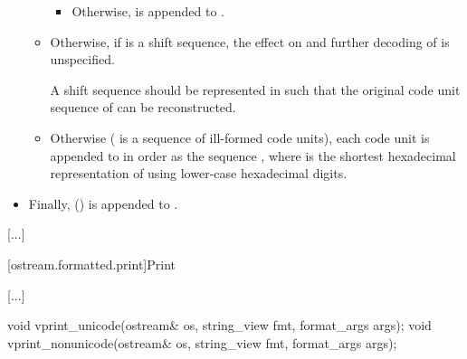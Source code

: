 \documentclass{wg21}
\begin{document}
\begin{itemize}
\begin{itemize}
\begin{itemize}
            \item
            Otherwise,  is appended to .
        \end{itemize}

        \item
        Otherwise, if  is a shift sequence,
        the effect on  and further decoding of 
        is unspecified.

        \recommended
        A shift sequence should be represented in 
        such that the original code unit sequence of 
        can be reconstructed.

        \item
        Otherwise ( is a sequence of ill-formed code units),
        each code unit  is appended to  in order
        as the sequence ,
        where 
        is the shortest hexadecimal representation of 
        using lower-case hexadecimal digits.
    \end{itemize}

    \item
    Finally,  ()
    is appended to .
\end{itemize}

\textcolor{noteclr}{[...]}

[ostream.formatted.print]{Print}{}

\textcolor{noteclr}{[...]}


%
%
\begin{itemdecl}
    void vprint_unicode(ostream& os, string_view fmt, format_args args);
    void vprint_nonunicode(ostream& os, string_view fmt, format_args args);
\end{itemdecl}
\end{document}
